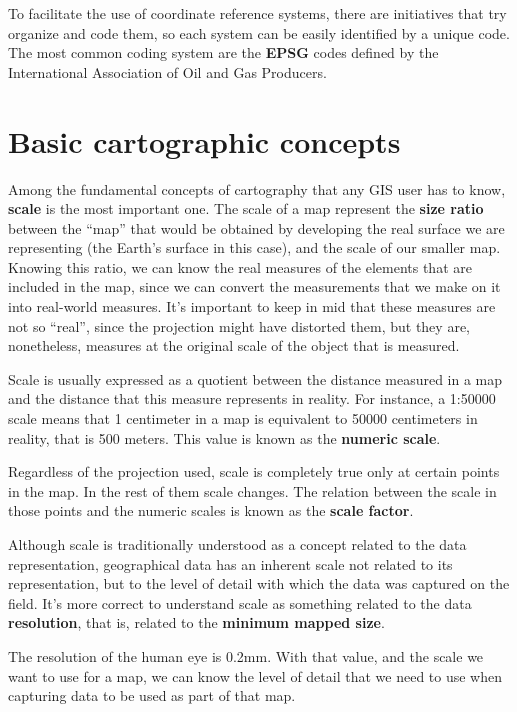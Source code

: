 To facilitate the use of coordinate reference systems, there are initiatives that try organize and code them, so each system can be easily identified by a unique code. The most common coding system are the \textbf{EPSG} codes defined by the International Association of Oil and Gas Producers. 


\section{Basic cartographic concepts}

Among the fundamental concepts of cartography that any GIS user has to know, \textbf{scale} is the most important one. The scale of a map represent the \textbf{size ratio} between the ``map'' that would be obtained by developing the real surface we are representing (the Earth's surface in this case), and the scale of our smaller map. Knowing this ratio, we can know the real measures of the elements that are included in the map, since we can convert the measurements that we make on it into real-world measures. It's important to keep in mid that these measures are not so ``real'', since the projection might have distorted them, but they are, nonetheless, measures at the original scale of the object that is measured.

Scale is usually expressed as a quotient between the distance measured in a map and the distance that this measure represents in reality. For instance, a 1:50000 scale means that 1 centimeter in a map is equivalent to 50000 centimeters in reality, that is 500 meters. This value is known as the \textbf{numeric scale}.

Regardless of the projection used, scale is completely true only at certain points in the map. In the rest of them scale changes. The relation between the scale in those points and the numeric scales is known as the \textbf{scale factor}.

Although scale is traditionally understood as a concept related to the data representation, geographical data has an inherent scale not related to its representation, but to the level of detail with which the data was captured on the field. It's more correct to understand scale as something related to the data \textbf{resolution}, that is, related to the \textbf{minimum mapped size}.

The resolution of the human eye is 0.2mm. With that value, and the scale we want to use for a map, we can know the level of detail that we need to use when capturing data to be used as part of that map. 

